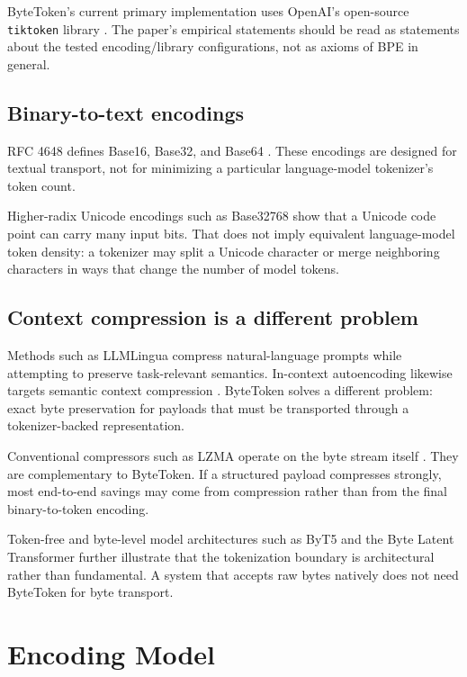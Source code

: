 \documentclass[11pt,a4paper]{article}
\begin{document}
ByteToken's current primary implementation uses OpenAI's open-source \texttt{tiktoken} library \cite{openai_tiktoken}. The paper's empirical statements should be read as statements about the tested encoding/library configurations, not as axioms of BPE in general.

\subsection{Binary-to-text encodings}

RFC 4648 defines Base16, Base32, and Base64 \cite{rfc4648}. These encodings are designed for textual transport, not for minimizing a particular language-model tokenizer's token count.

Higher-radix Unicode encodings such as Base32768 \cite{base32768} show that a Unicode code point can carry many input bits. That does not imply equivalent language-model token density: a tokenizer may split a Unicode character or merge neighboring characters in ways that change the number of model tokens.

\subsection{Context compression is a different problem}

Methods such as LLMLingua \cite{jiang2023llmlingua} compress natural-language prompts while attempting to preserve task-relevant semantics. In-context autoencoding likewise targets semantic context compression \cite{ge2023icae}. ByteToken solves a different problem: exact byte preservation for payloads that must be transported through a tokenizer-backed representation.

Conventional compressors such as LZMA operate on the byte stream itself \cite{pavlov_lzma}. They are complementary to ByteToken. If a structured payload compresses strongly, most end-to-end savings may come from compression rather than from the final binary-to-token encoding.

Token-free and byte-level model architectures such as ByT5 \cite{xue2022byt5} and the Byte Latent Transformer \cite{pagnoni2025blt} further illustrate that the tokenization boundary is architectural rather than fundamental. A system that accepts raw bytes natively does not need ByteToken for byte transport.

\section{Encoding Model}
\end{document}
